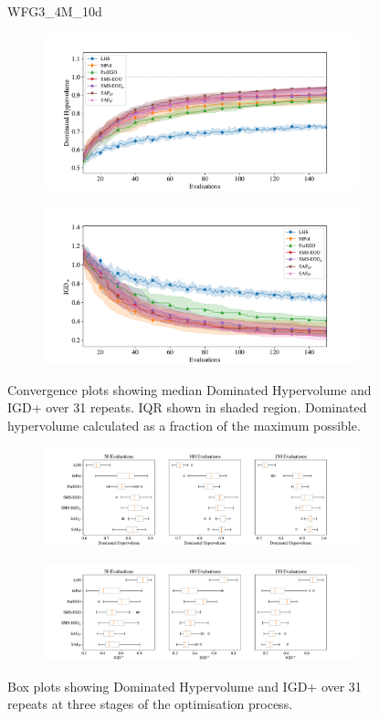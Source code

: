 \documentclass[conference]{IEEEtran}
\begin{document}
\begin{figure}
WFG3\_4M\_10d


\begin{subfigure}[hbt!]{\linewidth}

    \centering
    \includegraphics[width=0.7\linewidth]{figures/wfg3_4obj_10dim_hv_plot.pdf}
\end{subfigure}
\begin{subfigure}[h]{\linewidth}
    \centering
    \includegraphics[width=0.7\linewidth]{figures/wfg3_4obj_10dim_igd_plot.pdf}
\end{subfigure}
    \caption{Convergence plots showing median Dominated Hypervolume and IGD+ over 31 repeats. IQR shown in shaded region. Dominated hypervolume calculated as a fraction of the maximum possible.}
\vspace{\floatsep}
\begin{subfigure}[t]{\linewidth}
    \centering
    \includegraphics[width=0.8\linewidth]{figures/wfg3_4obj_10dim_hv_boxplot.pdf}
\end{subfigure}
\begin{subfigure}[t]{\linewidth}
    \centering
    \includegraphics[width=0.8\linewidth]{figures/wfg3_4obj_10dim_igd_boxplot.pdf}
\end{subfigure}
    \caption{Box plots showing Dominated Hypervolume and IGD+ over 31 repeats at three stages of the optimisation process.}
\end{figure}
\clearpage
\end{document}
